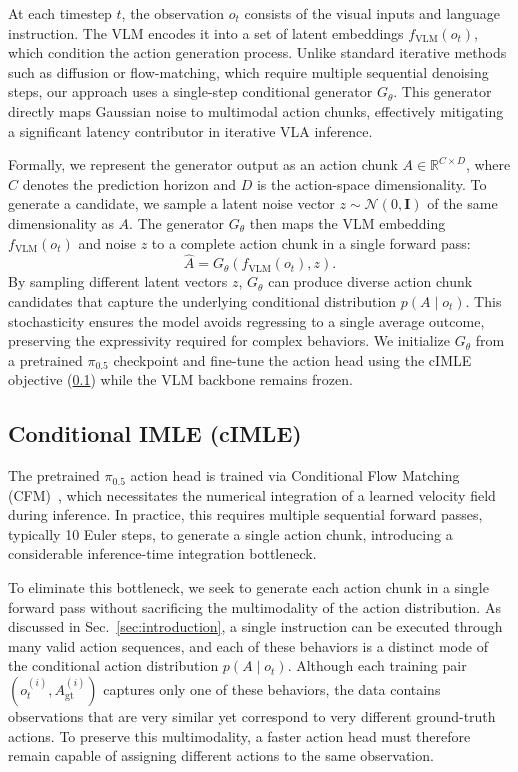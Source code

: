 \documentclass[letterpaper, 10 pt, conference]{ieeeconf}  %
\begin{document}
At each timestep $t$, the observation $o_t$ consists of the visual inputs and language instruction. The VLM encodes it into a set of latent embeddings $f_{\mathrm{VLM}}(o_t)$, which condition the action generation process. Unlike standard iterative methods such as diffusion or flow-matching, which require multiple sequential denoising steps, our approach uses a single-step conditional generator $G_\theta$. This generator directly maps Gaussian noise to multimodal action chunks, effectively mitigating a significant latency contributor in iterative VLA inference.

Formally, we represent the generator output as an action chunk $A \in \mathbb{R}^{C \times D}$, where $C$ denotes the prediction horizon and $D$ is the action-space dimensionality. 
To generate a candidate, we sample a latent noise vector $z \sim \mathcal{N}(0, \mathbf{I})$ of the same dimensionality as $A$. The generator $G_\theta$ then maps the VLM embedding $f_{\mathrm{VLM}}(o_t)$ and noise $z$ to a complete action chunk in a single forward pass:
\begin{equation}
\hat{A} = G_{\theta}(f_{\mathrm{VLM}}(o_t), z).
\end{equation}
By sampling different latent vectors $z$, $G_\theta$ can produce diverse action chunk candidates that capture the underlying conditional distribution $p(A \mid o_t)$. This stochasticity ensures the model avoids regressing to a single average outcome, preserving the expressivity required for complex behaviors.
We initialize $G_{\theta}$ from a pretrained $\pi_{0.5}$ checkpoint and fine-tune the action head using the cIMLE objective (\ref{sec:cimle}) while the VLM backbone remains frozen.

\subsection{Conditional IMLE (cIMLE)}\label{sec:cimle}
The pretrained $\pi_{0.5}$ action head is trained via Conditional Flow Matching (CFM)~\cite{lipman2023flow,black2024pi0}, which necessitates the numerical integration of a learned velocity field during inference. In practice, this requires multiple sequential forward passes, typically 10 Euler steps, to generate a single action chunk, introducing a considerable inference-time integration bottleneck.

To eliminate this bottleneck, we seek to generate each action chunk in a single forward pass without sacrificing the multimodality of the action distribution. As discussed in Sec.~\ref{sec:introduction}, a single instruction can be executed through many valid action sequences, and each of these behaviors is a distinct mode of the conditional action distribution $p(A \mid o_t)$. Although each training pair $(o_t^{(i)}, A_{\mathrm{gt}}^{(i)})$ captures only one of these behaviors, the data contains observations that are very similar yet correspond to very different ground-truth actions. To preserve this multimodality, a faster action head must therefore remain capable of assigning different actions to the same observation.
\end{document}
